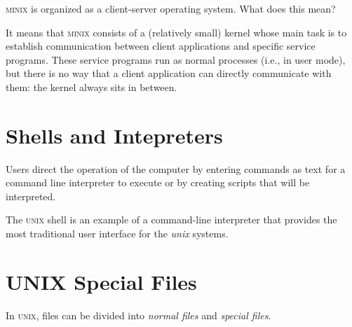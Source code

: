 \begin{example}
\textsc{minix} is organized as a client-server operating system. What does this mean?

It means that \textsc{minix} consists of a (relatively small) kernel whose main task is to establish communication between client applications and speciﬁc service programs. These service programs run
as normal processes (i.e., in user mode), but there is no way that a client application can directly
communicate with them: the kernel always sits in between.
\end{example}


\section{Shells and Intepreters}



Users direct the operation of the computer by entering commands as text for a command line interpreter to 
execute or by creating scripts that will be interpreted.

The \textsc{unix} shell is an example of a command-line interpreter 
that provides the most traditional user interface for the \textit{unix} systems. 



\section{UNIX Special Files}


In \textsc{unix}, files can be divided into \textit{normal files} 
and \textit{special files}.


\begin{figure}[h]
\end{figure}

